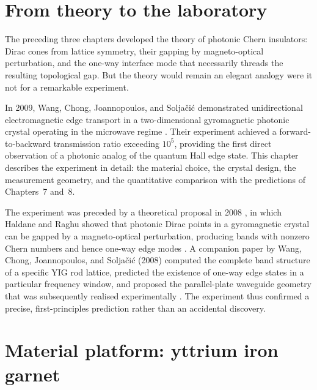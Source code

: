 
\section{From theory to the laboratory}
\label{sec:ch9-intro}

The preceding three chapters developed the theory of photonic Chern
insulators: Dirac cones from lattice symmetry, their gapping by
magneto-optical perturbation, and the one-way interface mode that
necessarily threads the resulting topological gap.  But the theory would
remain an elegant analogy were it not for a remarkable experiment.

In 2009, Wang, Chong, Joannopoulos, and Solja\v{c}i\'{c} demonstrated
unidirectional electromagnetic edge transport in a two-dimensional
gyromagnetic photonic crystal operating in the microwave regime
\cite{nature2026observation}.  Their experiment achieved a
forward-to-backward transmission ratio exceeding $10^5$, providing the
first direct observation of a photonic analog of the quantum Hall edge
state.  This chapter describes the experiment in detail: the material
choice, the crystal design, the measurement geometry, and the
quantitative comparison with the predictions of Chapters~7 and~8.

The experiment was preceded by a theoretical proposal in 2008
\cite{haldane2008possible}, in which Haldane and Raghu showed that
photonic Dirac points in a gyromagnetic crystal can be gapped by a
magneto-optical perturbation, producing bands with nonzero Chern
numbers and hence one-way edge modes
\cite{raghu2008analogs}.  A companion paper by Wang,
Chong, Joannopoulos, and Solja\v{c}i\'{c} (2008) computed the
complete band structure of a specific YIG rod lattice, predicted the
existence of one-way edge states in a particular frequency window, and
proposed the parallel-plate waveguide geometry that was subsequently
realised experimentally \cite{ozawa2018topological,wang2015topological}.  The experiment
thus confirmed a precise, first-principles prediction rather than an
accidental discovery.

\section{Material platform: yttrium iron garnet}
\label{sec:ch9-yig}

